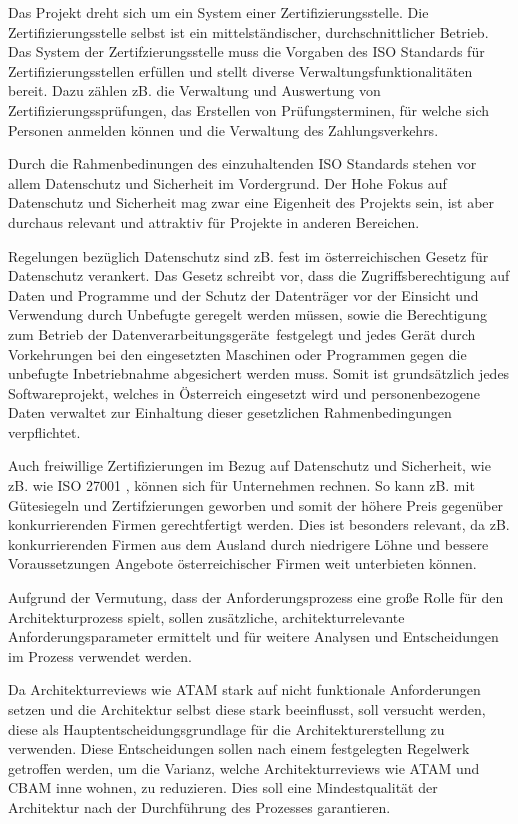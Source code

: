 Das Projekt dreht sich um ein System einer Zertifizierungsstelle. Die Zertifizierungsstelle selbst ist ein mittelständischer, durchschnittlicher Betrieb. Das System der Zertifzierungsstelle muss die Vorgaben des ISO Standards für Zertifizierungsstellen erfüllen\cite{ISO_CERT} und stellt diverse Verwaltungsfunktionalitäten bereit. Dazu zählen zB. die Verwaltung und Auswertung von Zertifizierungssprüfungen, das Erstellen von Prüfungsterminen, für welche sich Personen anmelden können und die Verwaltung des Zahlungsverkehrs.

Durch die Rahmenbedinungen des einzuhaltenden ISO Standards stehen vor allem Datenschutz und Sicherheit im Vordergrund. Der Hohe Fokus auf Datenschutz und Sicherheit mag zwar eine Eigenheit des Projekts sein, ist aber durchaus relevant und attraktiv für Projekte in anderen Bereichen.

Regelungen bezüglich Datenschutz sind zB. fest im österreichischen Gesetz für Datenschutz verankert. Das Gesetz schreibt vor, dass \glqq die Zugriffsberechtigung auf Daten und Programme und der Schutz der Datenträger vor der Einsicht und Verwendung durch Unbefugte\grqq \cite[§ 14, 5]{datenschutz} geregelt werden müssen, sowie \glqq die Berechtigung zum Betrieb der Datenverarbeitungsgeräte\grqq \ festgelegt \glqq und jedes Gerät durch Vorkehrungen bei den eingesetzten Maschinen oder Programmen gegen die unbefugte Inbetriebnahme\grqq \cite[§ 14, 6]{datenschutz} abgesichert werden muss. Somit ist grundsätzlich jedes Softwareprojekt, welches in Österreich eingesetzt wird und personenbezogene Daten verwaltet zur Einhaltung dieser gesetzlichen Rahmenbedingungen verpflichtet.

Auch freiwillige Zertifizierungen im Bezug auf Datenschutz und Sicherheit, wie zB. wie ISO 27001 \cite{ISO_SEC}, können sich für Unternehmen rechnen. So kann zB. mit Gütesiegeln und Zertifzierungen geworben und somit der höhere Preis gegenüber konkurrierenden Firmen gerechtfertigt werden. Dies ist besonders relevant, da zB. konkurrierenden Firmen aus dem Ausland durch niedrigere Löhne und bessere Voraussetzungen Angebote österreichischer Firmen weit unterbieten können.

Aufgrund der Vermutung, dass der Anforderungsprozess eine große Rolle für den Architekturprozess spielt, sollen zusätzliche, architekturrelevante Anforderungsparameter ermittelt und für weitere Analysen und Entscheidungen im Prozess verwendet werden.

Da Architekturreviews wie ATAM stark auf nicht funktionale Anforderungen setzen und die Architektur selbst diese stark beeinflusst, soll versucht werden, diese als Hauptentscheidungsgrundlage für die Architekturerstellung zu verwenden. Diese Entscheidungen sollen nach einem festgelegten Regelwerk getroffen werden, um die Varianz, welche Architekturreviews wie ATAM und CBAM inne wohnen, zu reduzieren. Dies soll eine Mindestqualität der Architektur nach der Durchführung des Prozesses garantieren.

